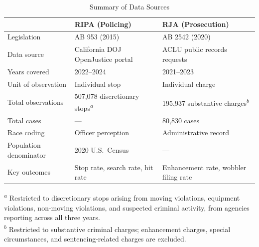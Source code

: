 \begin{table}[H]
\centering
\small
\caption{Summary of Data Sources}
\label{tab:data_summary}
\begin{tabular}{l p{5.5cm} p{5.5cm}}
\toprule
 & \textbf{RIPA (Policing)} & \textbf{RJA (Prosecution)} \\
\midrule
Legislation
    & AB 953 (2015)
    & AB 2542 (2020) \\
\addlinespace
Data source
    & California DOJ OpenJustice portal
    & ACLU public records requests \\
\addlinespace
Years covered
    & 2022--2024
    & 2021--2023 \\
\addlinespace
Unit of observation
    & Individual stop
    & Individual charge \\
\addlinespace
Total observations
    & 507,078 discretionary stops\textsuperscript{$a$}
    & 195,937 substantive charges\textsuperscript{$b$} \\
\addlinespace
Total cases
    & ---
    & 80,830 cases \\
\addlinespace
Race coding
    & Officer perception
    & Administrative record \\
\addlinespace
Population denominator
    & 2020 U.S.\ Census
    & --- \\
\addlinespace
Key outcomes
    & Stop rate, search rate, hit rate
    & Enhancement rate, wobbler filing rate \\
\bottomrule
\end{tabular}
\smallskip
\parbox{\textwidth}{\footnotesize
\textsuperscript{$a$} Restricted to discretionary stops arising from moving violations, equipment violations, non-moving violations, and suspected criminal activity, from agencies reporting across all three years. \\
\textsuperscript{$b$} Restricted to substantive criminal charges; enhancement charges, special circumstances, and sentencing-related charges are excluded.}
\end{table}